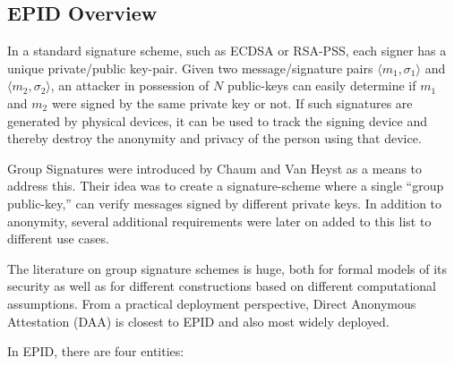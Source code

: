 \documentclass[10pt, letterpaper]{article}
\begin{document}
  \subsection{EPID Overview}
  \label{ssec:epid}
  In a standard signature scheme, such as ECDSA or RSA-PSS, each
  signer has a unique private/public key-pair. Given two
  message/signature pairs $\langle m_1, \sigma_1 \rangle$ and $\langle
  m_2, \sigma_2 \rangle$, an attacker in possession of $N$ public-keys
  can easily determine if $m_1$ and $m_2$ were signed by the same
  private key or not. If such signatures are generated by physical
  devices, it can be used to track the signing device and thereby
  destroy the anonymity and privacy of the person using that device.

  Group Signatures were introduced by Chaum and Van Heyst
  \cite{ChaumGroupSignatures} as a means to address this. Their idea
  was to create a signature-scheme where a single ``group
  public-key,'' can verify messages signed by different private
  keys. In addition to anonymity, several additional requirements were
  later on added to this list to different use cases.

  The literature on group signature schemes is huge, both for formal
  models of its security
  \cite{BMW03,dynamicGroupSignatures,fulldynamicgroupsignature} as
  well as for different constructions \cite{bbs, Furukawa2005,
    coalitionresistant, camenischLysyankaya} based on different
  computational assumptions. From a practical deployment perspective,
  Direct Anonymous Attestation \cite{daa, ucdaa} (DAA) is closest to
  EPID and also most widely deployed.


  In EPID, there are four entities:
\end{document}
